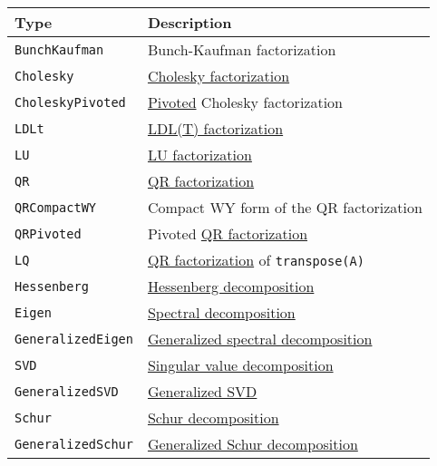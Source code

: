 \begin{table}[h]

\begin{tabulary}{\linewidth}{|L|L|}
\hline
Type & Description \\
\hline
\texttt{BunchKaufman} & Bunch-Kaufman factorization \\
\hline
\texttt{Cholesky} & \href{https://en.wikipedia.org/wiki/Cholesky\_decomposition}{Cholesky factorization} \\
\hline
\texttt{CholeskyPivoted} & \href{https://en.wikipedia.org/wiki/Pivot\_element}{Pivoted} Cholesky factorization \\
\hline
\texttt{LDLt} & \href{https://en.wikipedia.org/wiki/Cholesky\_decomposition\#LDL\_decomposition}{LDL(T) factorization} \\
\hline
\texttt{LU} & \href{https://en.wikipedia.org/wiki/LU\_decomposition}{LU factorization} \\
\hline
\texttt{QR} & \href{https://en.wikipedia.org/wiki/QR\_decomposition}{QR factorization} \\
\hline
\texttt{QRCompactWY} & Compact WY form of the QR factorization \\
\hline
\texttt{QRPivoted} & Pivoted \href{https://en.wikipedia.org/wiki/QR\_decomposition}{QR factorization} \\
\hline
\texttt{LQ} & \href{https://en.wikipedia.org/wiki/QR\_decomposition}{QR factorization} of \texttt{transpose(A)} \\
\hline
\texttt{Hessenberg} & \href{http://mathworld.wolfram.com/HessenbergDecomposition.html}{Hessenberg decomposition} \\
\hline
\texttt{Eigen} & \href{https://en.wikipedia.org/wiki/Eigendecomposition\_of\_a\_matrix}{Spectral decomposition} \\
\hline
\texttt{GeneralizedEigen} & \href{https://en.wikipedia.org/wiki/Eigendecomposition\_of\_a\_matrix\#Generalized\_eigenvalue\_problem}{Generalized spectral decomposition} \\
\hline
\texttt{SVD} & \href{https://en.wikipedia.org/wiki/Singular\_value\_decomposition}{Singular value decomposition} \\
\hline
\texttt{GeneralizedSVD} & \href{https://en.wikipedia.org/wiki/Generalized\_singular\_value\_decomposition\#Higher\_order\_version}{Generalized SVD} \\
\hline
\texttt{Schur} & \href{https://en.wikipedia.org/wiki/Schur\_decomposition}{Schur decomposition} \\
\hline
\texttt{GeneralizedSchur} & \href{https://en.wikipedia.org/wiki/Schur\_decomposition\#Generalized\_Schur\_decomposition}{Generalized Schur decomposition} \\
\hline
\end{tabulary}

\end{table}



